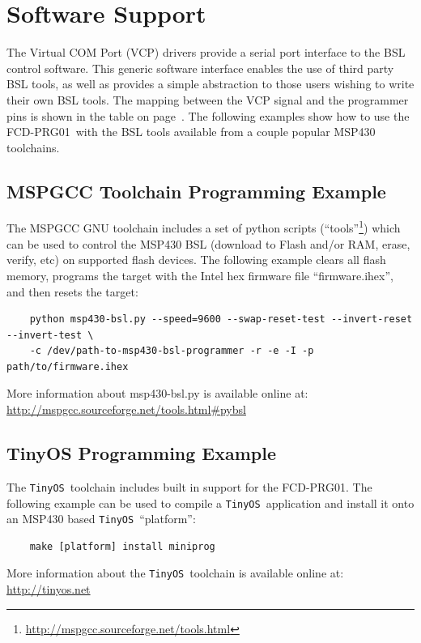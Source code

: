\documentclass[10pt,letterpaper]{datasheet}
\newcommand{\PID}{FCD-PRG01}
\newcommand{\tos}{\texttt{TinyOS}}
\begin{document}
\newpage

\section*{Software Support}
\begin{flushleft}
The Virtual COM Port (VCP) drivers provide a serial port interface to the BSL control software.  This generic software interface enables the use of third party BSL tools, as well as provides a simple abstraction to those users wishing to write their own BSL tools.  The mapping between the VCP signal and the programmer pins is shown in the table on page~\pageref{tab:pinout}.  The following examples show how to use the \PID\ with the BSL tools available from a couple popular MSP430 toolchains.

\subsection*{MSPGCC Toolchain Programming Example}
The MSPGCC GNU toolchain includes a set of python scripts (``tools''\footnote{\href{http://mspgcc.sourceforge.net/tools.html}{http://mspgcc.sourceforge.net/tools.html}}) which can be used to control the MSP430 BSL (download to Flash and/or RAM, erase, verify, etc) on supported flash devices.  The following example clears all flash memory, programs the target with the Intel hex firmware file ``firmware.ihex'', and then resets the target:
\begin{verbatim}
    python msp430-bsl.py --speed=9600 --swap-reset-test --invert-reset --invert-test \
    -c /dev/path-to-msp430-bsl-programmer -r -e -I -p path/to/firmware.ihex
\end{verbatim}
More information about msp430-bsl.py is available online at: \href{http://mspgcc.sourceforge.net/tools.html\#pybsl}{http://mspgcc.sourceforge.net/tools.html\#pybsl}

\subsection*{TinyOS Programming Example}
The \tos\ toolchain includes built in support for the \PID.  The following example can be used to compile a \tos\ application and install it onto an MSP430 based \tos\ ``platform'':
\begin{verbatim}
    make [platform] install miniprog
\end{verbatim}
More information about the \tos\ toolchain is available online at: \href{http://tinyos.net}{http://tinyos.net}
\end{flushleft}
\end{document}
